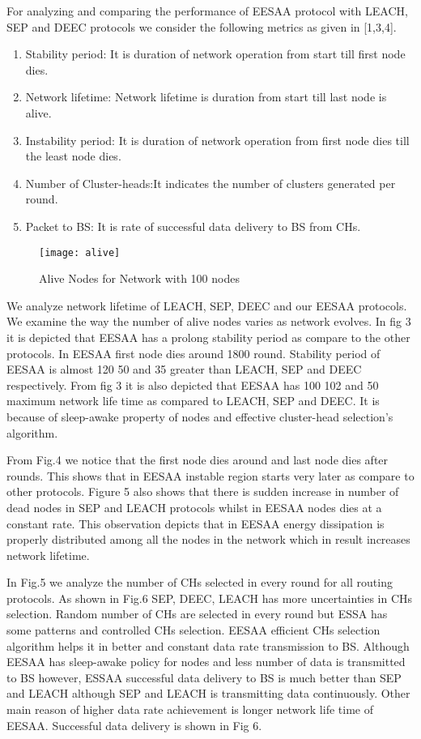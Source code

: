 \documentclass[journal]{IEEEtran}
\begin{document}
For analyzing and comparing the performance of EESAA protocol with LEACH, SEP and DEEC protocols we consider the following metrics as given in [1,3,4].

\begin{enumerate}
  \item Stability period: It is duration of network operation from start till first node dies.
  \item Network lifetime: Network lifetime is duration from start till last node is alive.
   \item Instability period: It is duration of network operation from first node dies till the least node dies.
  \item Number of Cluster-heads:It indicates the number of clusters generated per round.
  \item Packet to BS: It is rate of successful data delivery to BS from CHs.
  \end{enumerate}

\begin{figure*}[t]
\centering
  \texttt{[image: alive]}
  \caption{Alive Nodes for  Network with 100 nodes}\label{abc}
\end{figure*}

We analyze network lifetime of LEACH, SEP, DEEC and our EESAA protocols. We examine the way the number of alive nodes varies as network evolves. In fig 3 it is depicted that EESAA has a prolong stability period as compare to the other protocols. In EESAA first node dies around 1800 round. Stability period of EESAA is almost 120 50 and 35 greater than LEACH, SEP and DEEC respectively. From fig 3 it is also depicted that EESAA has 100 102 and 50 maximum network life time as compared to LEACH, SEP and DEEC. It is because of sleep-awake property of nodes and effective cluster-head selection's algorithm.

From Fig.4 we notice that the first node dies around  and last node dies after  rounds. This shows that in EESAA instable region starts very later as compare to other protocols. Figure 5 also shows that there is sudden increase in number of dead nodes in SEP and LEACH protocols whilst in EESAA nodes dies at a constant rate. This observation depicts that in EESAA energy dissipation is properly distributed among all the nodes in the network which in result increases network lifetime.

In Fig.5 we analyze the number of CHs selected in every round for all routing protocols. As shown in Fig.6 SEP, DEEC, LEACH has more uncertainties in CHs selection. Random number of CHs are selected in every round but ESSA has some patterns and controlled CHs selection. EESAA efficient CHs selection algorithm helps it in better and constant data rate transmission to BS. Although EESAA has sleep-awake policy for nodes and less number of data is transmitted to BS however, ESSAA successful data delivery to BS is much better than SEP and LEACH although SEP and LEACH is transmitting data continuously. Other main reason of higher data rate achievement is longer network life time of EESAA. Successful data delivery is shown in Fig 6.
\end{document}
